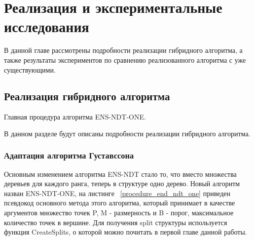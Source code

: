 \chapter{Реализация и экспериментальные исследования}
\label{chapter3}

В данной главе рассмотрены подробности реализации гибридного алгоритма, а также результаты экспериментов по сравнению реализованного алгоритма с уже существующими.

\section{Реализация гибридного алгоритма}

\begin{algorithm}
\begin{algorithmic}[1]
        \EndIf
    \EndFor
\EndProcedure
\end{algorithmic}
\caption{Главная процедура алгоритма ENS-NDT-ONE.}
\label{procedure_end_ndt_one}
\end{algorithm}

В данном разделе будут описаны подробности реализации гибридного алгоритма. 

\subsection{Адаптация алгоритма Густавссона}

Основным изменением алгоритма ENS-NDT стало то, что вместо множества деревьев для каждого ранга, теперь в структуре одно дерево. Новый алгоритм назван ENS-NDT-ONE, на листинге ~\ref{procedure_end_ndt_one} приведен псевдокод основного метода этого алгоритма, который принимает в качестве аргументов множество точек P, M - размерность и B - порог, максимальное количество точек в вершине. Для получения split структуры используется функция CreateSplits, о которой можно почитать в первой главе данной работы.

